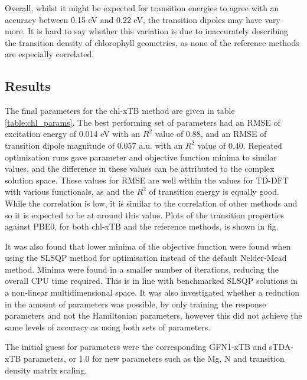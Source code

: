 Overall, whilst it might be expected for transition energies to agree with an accuracy 
between 0.15 eV and 0.22 eV, the transition dipoles may have vary more. It is hard
to say whether this variation is due to inaccurately describing the transition density
of chlorophyll geometries, as none of the reference methods are especially correlated.

\afterpartskip
\subsection{Results}
\label{subsec:chl_opt_results}

The final parameters for the chl-xTB method are given in table \ref{table:chl_params}.
The best performing set of parameters had an RMSE of excitation energy of 0.014 eV 
with an $R^2$ value of 0.88, and an RMSE of transition dipole magnitude of 0.057 a.u. 
with an $R^2$ value of 0.40. Repeated optimisation runs gave parameter and objective
function minima to similar values, and the difference in these values can be attributed
to the complex solution space. These values for RMSE are well within the values
for TD-DFT with various functionals, as and the $R^2$ of transition energy is equally
good. While the correlation is low, it is similar to the correlation of other methods
and so it is expected to be at around this value. Plots of the transition properties 
against PBE0, for both chl-xTB and the reference methods, is shown in fig.

It was also found that lower minima of the objective function were found when using
the SLSQP method for optimisation instead of the default Nelder-Mead method. Minima
were found in a smaller number of iterations, reducing the overall CPU time required.
This is in line with benchmarked SLSQP solutions in a non-linear multidimensional space.
It was also investigated whether a reduction in the amount of parameters was possible,
by only training the response parameters and not the Hamiltonian parameters, however 
this did not achieve the same levels of accuracy as using both sets of parameters.

The initial guess for parameters were the corresponding GFN1-xTB and sTDA-xTB
parameters, or 1.0 for new parameters such as the Mg, N and transition density matrix
scaling.

